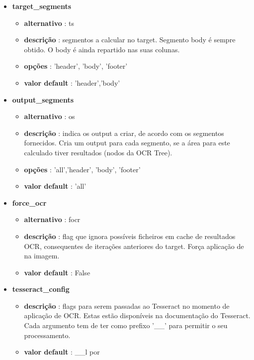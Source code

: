 \begin{itemize}
	\item \textbf{target\_segments}
		\begin{itemize}\setlength\itemsep{-0.5em}
			\vspace{-1em}
			\item \textbf{alternativo} : ts
			\item \textbf{descrição} : segmentos a calcular no target. Segmento body é sempre obtido. O body é ainda repartido nas suas colunas.
			\item \textbf{opções} : 'header', 'body', 'footer'
			\item \textbf{valor default} : 'header','body'
		\end{itemize}
		
	\item \textbf{output\_segments}
	\begin{itemize}\setlength\itemsep{-0.5em}
		\vspace{-1em}
		\item \textbf{alternativo} : os
		\item \textbf{descrição} : indica os output a criar, de acordo com os segmentos fornecidos. Cria um output para cada segmento, se a área para este calculado tiver resultados (nodos da OCR Tree).
		\item \textbf{opções} : 'all','header', 'body', 'footer'
		\item \textbf{valor default} : 'all'
	\end{itemize}
		
	\item \textbf{force\_ocr}
		\begin{itemize}\setlength\itemsep{-0.5em}
			\vspace{-1em}
			\item \textbf{alternativo} : focr
			\item \textbf{descrição} : flag que ignora possíveis ficheiros em cache de resultados OCR, consequentes de iterações anteriores do target. Força aplicação de na imagem.
			\item \textbf{valor default} : False
		\end{itemize}
		
	\item \textbf{tesseract\_config}
		\begin{itemize}\setlength\itemsep{-0.5em}
			\vspace{-1em}
			\item \textbf{descrição} : flags para serem passadas ao Tesseract no momento de aplicação de OCR. Estas estão disponíveis na documentação do Tesseract. Cada argumento tem de ter como prefixo '\_\_' para permitir o seu processamento.
			\item \textbf{valor default} : \_\_l por
		\end{itemize}
	

\end{itemize}
